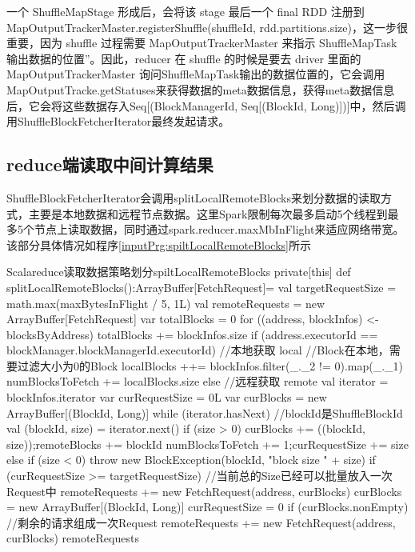 一个 ShuffleMapStage 形成后，会将该 stage 最后一个 final RDD 注册到 MapOutputTrackerMaster.registerShuffle(shuffleId, rdd.partitions.size)，这一步很重要，因为 shuffle 过程需要 MapOutputTrackerMaster 来指示 ShuffleMapTask 输出数据的位置”。因此，reducer 在 shuffle 的时候是要去 driver 里面的 MapOutputTrackerMaster 询问ShuffleMapTask输出的数据位置的，它会调用MapOutputTracke.getStatuses来获得数据的meta数据信息，获得meta数据信息后，它会将这些数据存入Seq[(BlockManagerId, Seq[(BlockId, Long)])]中，然后调用ShuffleBlockFetcherIterator最终发起请求。

\subsection{reduce端读取中间计算结果}
ShuffleBlockFetcherIterator会调用splitLocalRemoteBlocks来划分数据的读取方式，主要是本地数据和远程节点数据。这里Spark限制每次最多启动5个线程到最多5个节点上读取数据，同时通过spark.reducer.maxMbInFlight来适应网络带宽。该部分具体情况如程序\ref{inputPrg:spiltLocalRemoteBlocks}所示
\begin{codeInput}{Scala}{reduce读取数据策略划分}{spiltLocalRemoteBlocks}
private[this] def splitLocalRemoteBlocks():ArrayBuffer[FetchRequest]={
  val targetRequestSize = math.max(maxBytesInFlight / 5, 1L)
  val remoteRequests = new ArrayBuffer[FetchRequest]
  var totalBlocks = 0
  for ((address, blockInfos) <- blocksByAddress) {
    totalBlocks += blockInfos.size
    if (address.executorId == blockManager.blockManagerId.executorId) {//本地获取 local
    //Block在本地，需要过滤大小为0的Block
    localBlocks ++= blockInfos.filter(_._2 != 0).map(_._1)
    numBlocksToFetch += localBlocks.size
    } else {//远程获取 remote
      val iterator = blockInfos.iterator
      var curRequestSize = 0L
      var curBlocks = new ArrayBuffer[(BlockId, Long)]
      while (iterator.hasNext) {//blockId是ShuffleBlockId
        val (blockId, size) = iterator.next()
        if (size > 0) {
          curBlocks += ((blockId, size));remoteBlocks += blockId
          numBlocksToFetch += 1;curRequestSize += size
        } else if (size < 0) {
          throw new BlockException(blockId, "block size " + size)
        }
        if (curRequestSize >= targetRequestSize) {
          //当前总的Size已经可以批量放入一次Request中
          remoteRequests += new FetchRequest(address, curBlocks)
          curBlocks = new ArrayBuffer[(BlockId, Long)]
          curRequestSize = 0
        }
      }
      if (curBlocks.nonEmpty) {//剩余的请求组成一次Request
        remoteRequests += new FetchRequest(address, curBlocks)
      }
    }
  }
  remoteRequests
}
\end{codeInput}
